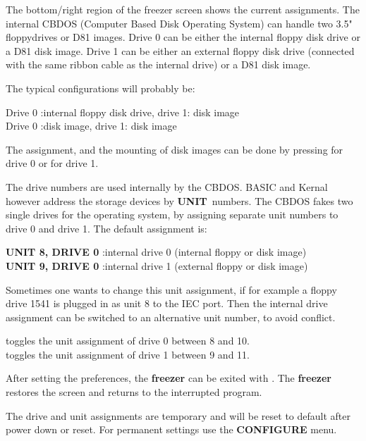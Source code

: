 The bottom/right region of the freezer screen shows the current assignments.
The internal CBDOS (Computer Based Disk Operating System) can handle two
3.5" floppydrives or D81 images.
Drive 0 can be either the internal floppy disk drive or a D81 disk image.
Drive 1 can be either an external floppy disk drive (connected with the
same ribbon cable as the internal drive) or a D81 disk image.

The typical configurations will probably be:

Drive 0 :internal floppy disk drive, drive 1: disk image \\
Drive 0 :disk image, drive 1: disk image

The assignment, and the mounting of disk images can be done by pressing
 for drive 0 or  for drive 1.

The drive numbers are used internally by the CBDOS. BASIC and Kernal
however address the storage devices by {\bf UNIT} numbers.
The CBDOS fakes two single drives for the
operating system, by assigning separate unit numbers to drive 0 and drive 1.
The default assignment is:

{\bf UNIT 8, DRIVE 0} :internal drive 0 (internal floppy or disk image) \\
{\bf UNIT 9, DRIVE 0} :internal drive 1 (external floppy or disk image)

Sometimes one wants to change this unit assignment, if for example
a floppy drive 1541 is plugged in as unit 8 to the IEC port.
Then the internal drive assignment can be switched to an alternative unit
number, to avoid conflict.

 toggles the unit assignment of drive 0 between 8 and 10. \\
 toggles the unit assignment of drive 1 between 9 and 11.

After setting the preferences, the {\bf freezer} can be exited
with . The {\bf freezer} restores the screen and
returns to the interrupted program.

The drive and unit assignments are temporary and will be reset to default
after power down or reset. For permanent settings use the {\bf CONFIGURE}
menu.

